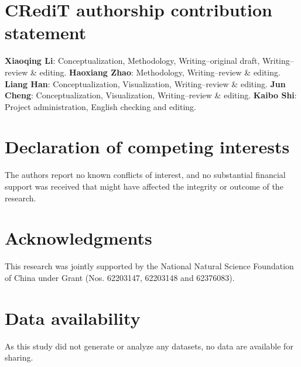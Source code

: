 \documentclass[preprint,review,fleqn,sort&compress,3p]{elsarticle}
\theoremstyle{definition} %
\theoremstyle{definition}%
\begin{document}
\section*{CRediT authorship contribution statement}
{\bf Xiaoqing Li}: Conceptualization, Methodology, Writing--original draft, Writing--review \& editing. %
{\bf Haoxiang Zhao}: Methodology, Writing--review \& editing. 
{\bf Liang Han}: Conceptualization, Visualization, Writing--review \& editing.
{\bf Jun Cheng}: Conceptualization, Visualization, Writing--review \& editing. 
{\bf Kaibo Shi}: Project administration, English checking and editing. 
\section*{Declaration of competing interests}
The authors report no known conflicts of interest, and no substantial financial support was received that might have affected the integrity or outcome of the research.

\section*{Acknowledgments}
This research was jointly supported by the National Natural Science Foundation of China under Grant (Nos. 62203147, 62203148 and 62376083).
\section*{Data availability}
As this study did not generate or analyze any datasets, no data are available for sharing.

 
 
\end{document}
